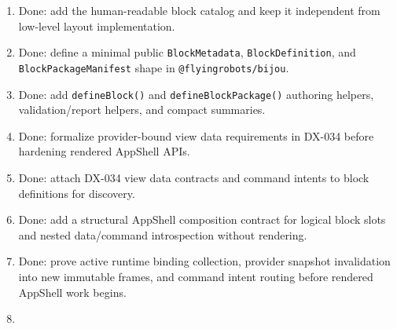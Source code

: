 \begin{enumerate}
\def\labelenumi{\arabic{enumi}.}
\tightlist
\item
  Done: add the human-readable block catalog and keep it independent from low-level layout implementation.
\item
  Done: define a minimal public \texttt{B\allowbreak{}l\allowbreak{}o\allowbreak{}c\allowbreak{}k\allowbreak{}M\allowbreak{}e\allowbreak{}t\allowbreak{}a\allowbreak{}d\allowbreak{}a\allowbreak{}t\allowbreak{}a}, \texttt{B\allowbreak{}l\allowbreak{}o\allowbreak{}c\allowbreak{}k\allowbreak{}D\allowbreak{}e\allowbreak{}f\allowbreak{}i\allowbreak{}n\allowbreak{}i\allowbreak{}t\allowbreak{}i\allowbreak{}o\allowbreak{}n}, and \texttt{B\allowbreak{}l\allowbreak{}o\allowbreak{}c\allowbreak{}k\allowbreak{}P\allowbreak{}a\allowbreak{}c\allowbreak{}k\allowbreak{}a\allowbreak{}g\allowbreak{}e\allowbreak{}M\allowbreak{}a\allowbreak{}n\allowbreak{}i\allowbreak{}f\allowbreak{}e\allowbreak{}s\allowbreak{}t} shape in \texttt{@\allowbreak{}f\allowbreak{}l\allowbreak{}y\allowbreak{}i\allowbreak{}n\allowbreak{}g\allowbreak{}r\allowbreak{}o\allowbreak{}b\allowbreak{}o\allowbreak{}t\allowbreak{}s\allowbreak{}/\allowbreak{}b\allowbreak{}i\allowbreak{}j\allowbreak{}o\allowbreak{}u}.
\item
  Done: add \texttt{d\allowbreak{}e\allowbreak{}f\allowbreak{}i\allowbreak{}n\allowbreak{}e\allowbreak{}B\allowbreak{}l\allowbreak{}o\allowbreak{}c\allowbreak{}k\allowbreak{}(\allowbreak{})} and \texttt{d\allowbreak{}e\allowbreak{}f\allowbreak{}i\allowbreak{}n\allowbreak{}e\allowbreak{}B\allowbreak{}l\allowbreak{}o\allowbreak{}c\allowbreak{}k\allowbreak{}P\allowbreak{}a\allowbreak{}c\allowbreak{}k\allowbreak{}a\allowbreak{}g\allowbreak{}e\allowbreak{}(\allowbreak{})} authoring helpers, validation/report helpers, and compact summaries.
\item
  Done: formalize provider-bound view data requirements in DX-034 before hardening rendered AppShell APIs.
\item
  Done: attach DX-034 view data contracts and command intents to block definitions for discovery.
\item
  Done: add a structural AppShell composition contract for logical block slots and nested data/command introspection without rendering.
\item
  Done: prove active runtime binding collection, provider snapshot invalidation into new immutable frames, and command intent routing before rendered AppShell work begins.
\item

\end{enumerate}
